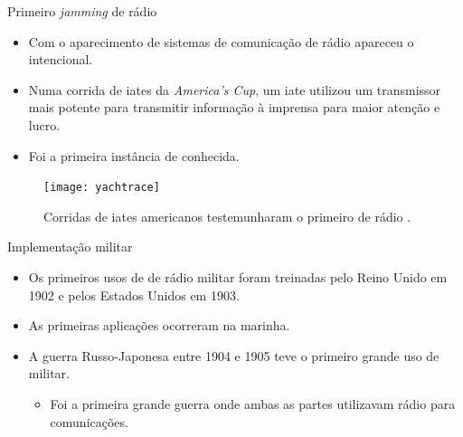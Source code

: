 \documentclass[portuguese,10pt]{beamer}
\begin{document}
\begin{frame}{Primeiro \textit{jamming} de rádio}
    \begin{minipage}[c]{0.6\linewidth}
        \begin{itemize}
            \item Com o aparecimento de sistemas de comunicação de rádio apareceu o \jamming{} intencional.
            \pause
            \item Numa corrida de iates da \textit{America's Cup}, um iate utilizou um transmissor mais potente para transmitir informação à imprensa para maior atenção e lucro.
            \item Foi a primeira instância de \jamming{} conhecida.
        \end{itemize}
    \end{minipage}
    \begin{minipage}[c]{0.39\linewidth}
        \begin{figure}[]
            \centering
            \texttt{[image: yachtrace]}
            \caption{Corridas de iates americanos testemunharam o primeiro \jamming{} de rádio \cite{earlyradio}.}
            \label{fig:yachtrace}
        \end{figure}
    \end{minipage}
\end{frame}

\begin{frame}{Implementação militar}
    \begin{itemize}
        \item<1-> Os primeiros usos de \jamming{} de rádio militar foram treinadas pelo Reino Unido em 1902 e pelos Estados Unidos em 1903.
        \item<2-> As primeiras aplicações ocorreram na marinha.
        \item<3-> A guerra Russo-Japonesa entre 1904 e 1905 teve o primeiro grande uso de \jamming{} militar.
        \begin{itemize}
            \item Foi a primeira grande guerra onde ambas as partes utilizavam rádio para comunicações.
        \end{itemize}
    \end{itemize}
\end{frame}
\end{document}
